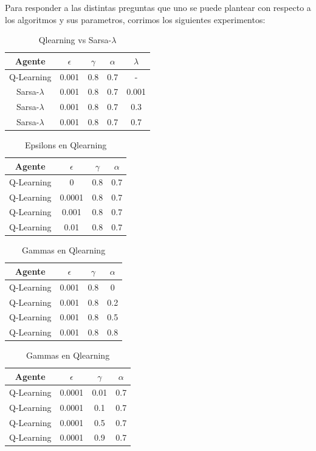 \documentclass[11pt, a4paper]{article}
\newcommand{\slambda}{Sarsa-$\lambda$ }
\begin{document}
Para responder a las distintas preguntas que uno se puede plantear con respecto a los algoritmos y sus parametros, corrimos los siguientes experimentos:

\bigskip

\begin{table}[h]
\center
\begin{tabular}{ | c | c | c | c | c| }
  \hline
  Agente & $\epsilon$ & $\gamma$ & $\alpha$ & $\lambda$ \\
  \hline 
 	 Q-Learning  & 0.001  & 0.8  & 0.7 & - \\
	\slambda & 0.001  & 0.8  & 0.7 & 0.001 \\
	\slambda & 0.001  & 0.8  & 0.7 & 0.3 \\
	\slambda  & 0.001  & 0.8  & 0.7 & 0.7\\
  \hline

\end{tabular}
\caption {Qlearning vs \slambda}
\end{table}

\begin{table}[h]
\center
\begin{tabular}{ | c | c | c | c | }
  \hline
  Agente & $\epsilon$ & $\gamma$ & $\alpha$ \\
  \hline 
 	 Q-Learning  & 0  & 0.8  & 0.7 \\
	 Q-Learning  & 0.0001  & 0.8  & 0.7 \\
	 Q-Learning  & 0.001  & 0.8  & 0.7 \\
	 Q-Learning  & 0.01  & 0.8  & 0.7 \\
  \hline
\end{tabular}
\caption {Epsilons en Qlearning}
\end{table}

\begin{table}[h]
\center
\begin{tabular}{ | c | c | c | c | }
  \hline
  Agente & $\epsilon$ & $\gamma$ & $\alpha$ \\
  \hline 
 	 Q-Learning  & 0.001  & 0.8  & 0 \\
	 Q-Learning  & 0.001  & 0.8  & 0.2 \\
	 Q-Learning  & 0.001  & 0.8  & 0.5 \\
	 Q-Learning  & 0.001  & 0.8  & 0.8 \\
  \hline
\end{tabular}
\caption {Gammas en Qlearning}
\end{table}

\begin{table}[h]
\center
\begin{tabular}{ | c | c | c | c | }
  \hline
  Agente & $\epsilon$ & $\gamma$ & $\alpha$ \\
  \hline 
 	 Q-Learning  & 0.0001  & 0.01  & 0.7 \\
	 Q-Learning  & 0.0001  & 0.1  & 0.7 \\
	 Q-Learning  & 0.0001  & 0.5  & 0.7 \\
	 Q-Learning  & 0.0001  & 0.9  & 0.7 \\
  \hline
\end{tabular}
\caption {Gammas en Qlearning}
\end{table}
\end{document}
